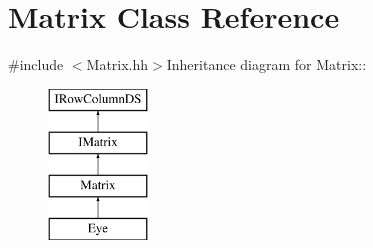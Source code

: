 \hypertarget{classMatrix}{
\section{Matrix Class Reference}
\label{classMatrix}
}


{\ttfamily \#include $<$Matrix.hh$>$}Inheritance diagram for Matrix::\begin{figure}[H]
\begin{center}
\leavevmode
\includegraphics[height=4cm]{classMatrix}
\end{center}
\end{figure}
